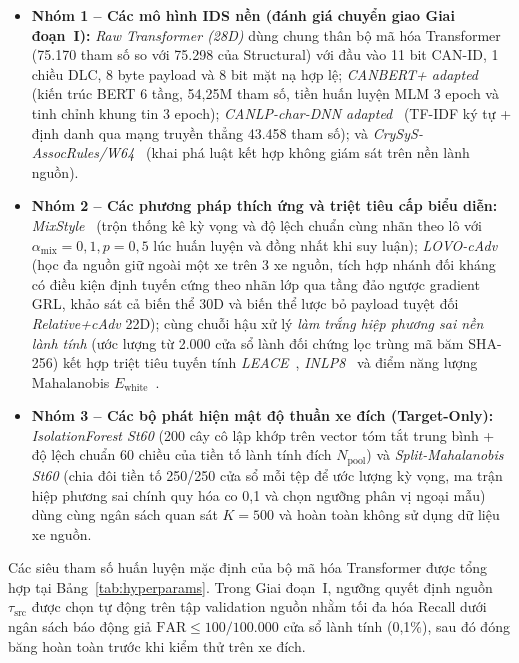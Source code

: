 \documentclass[12pt, a4paper, reqno, oneside]{book}
\begin{document}
\begin{itemize}
  \item \textbf{Nhóm 1 -- Các mô hình IDS nền (đánh giá chuyển giao Giai đoạn~I):} \textit{Raw Transformer (28D)} dùng chung thân bộ mã hóa Transformer (75.170 tham số so với 75.298 của Structural) với đầu vào 11 bit CAN-ID, 1 chiều DLC, 8 byte payload và 8 bit mặt nạ hợp lệ; \textit{CANBERT+ adapted}~\cite{won2026canbertplus} (kiến trúc BERT 6 tầng, 54,25M tham số, tiền huấn luyện MLM 3 epoch và tinh chỉnh khung tin 3 epoch); \textit{CANLP-char-DNN adapted}~\cite{balasubramanian2025canlp} (TF-IDF ký tự + định danh qua mạng truyền thẳng 43.458 tham số); và \textit{CrySyS-AssocRules/W64}~\cite{koltai2026trust} (khai phá luật kết hợp không giám sát trên nền lành nguồn).
  \item \textbf{Nhóm 2 -- Các phương pháp thích ứng và triệt tiêu cấp biểu diễn:} \textit{MixStyle}~\cite{zhou2021mixstyle} (trộn thống kê kỳ vọng và độ lệch chuẩn cùng nhãn theo lô với $\alpha_{\text{mix}}=0{,}1, p=0{,}5$ lúc huấn luyện và đồng nhất khi suy luận); \textit{LOVO-cAdv}~\cite{ganin2016dann} (học đa nguồn giữ ngoài một xe trên 3 xe nguồn, tích hợp nhánh đối kháng có điều kiện định tuyến cứng theo nhãn lớp qua tầng đảo ngược gradient GRL, khảo sát cả biến thể 30D và biến thể lược bỏ payload tuyệt đối \textit{Relative+cAdv} 22D); cùng chuỗi hậu xử lý \textit{làm trắng hiệp phương sai nền lành tính} (ước lượng từ 2.000 cửa sổ lành đối chứng lọc trùng mã băm SHA-256) kết hợp triệt tiêu tuyến tính \textit{LEACE}~\cite{belrose2023leace}, \textit{INLP8}~\cite{ravfogel2020null} và điểm năng lượng Mahalanobis $E_{\text{white}}$~\cite{lee2018mahalanobis}.
  \item \textbf{Nhóm 3 -- Các bộ phát hiện mật độ thuần xe đích (Target-Only):} \textit{IsolationForest St60} (200 cây cô lập khớp trên vector tóm tắt trung bình + độ lệch chuẩn 60 chiều của tiền tố lành tính đích $N_{\text{pool}}$) và \textit{Split-Mahalanobis St60} (chia đôi tiền tố 250/250 cửa sổ mỗi tệp để ước lượng kỳ vọng, ma trận hiệp phương sai chính quy hóa co 0,1 và chọn ngưỡng phân vị ngoại mẫu) dùng cùng ngân sách quan sát $K=500$ và hoàn toàn không sử dụng dữ liệu xe nguồn.
\end{itemize}

Các siêu tham số huấn luyện mặc định của bộ mã hóa Transformer được tổng hợp tại Bảng~\ref{tab:hyperparams}. Trong Giai đoạn~I, ngưỡng quyết định nguồn $\tau_{\text{src}}$ được chọn tự động trên tập validation nguồn nhằm tối đa hóa Recall dưới ngân sách báo động giả $\text{FAR} \le 100/100.000$ cửa sổ lành tính (0,1\%), sau đó đóng băng hoàn toàn trước khi kiểm thử trên xe đích.
\end{document}
